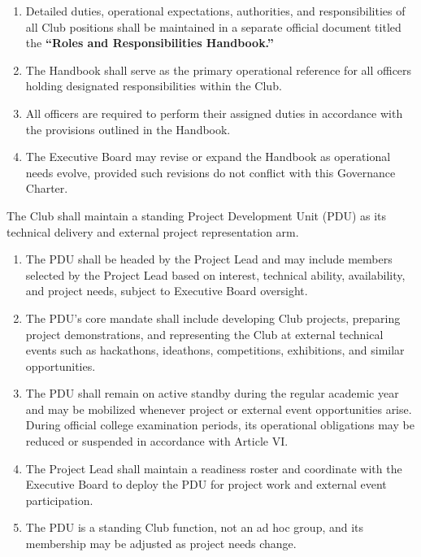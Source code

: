 \begin{enumerate}[label=\alph*), leftmargin=2em, itemsep=0.3em]
    \item Detailed duties, operational expectations, authorities, and responsibilities of all Club positions shall be maintained in a separate official document titled the \textbf{``Roles and Responsibilities Handbook.''}
    
    \item The Handbook shall serve as the primary operational reference for all officers holding designated responsibilities within the Club.
    
    \item All officers are required to perform their assigned duties in accordance with the provisions outlined in the Handbook.
    
    \item The Executive Board may revise or expand the Handbook as operational needs evolve, provided such revisions do not conflict with this Governance Charter.
\end{enumerate}


The Club shall maintain a standing Project Development Unit (PDU) as its technical delivery and external project representation arm.

\begin{enumerate}[label=\alph*), leftmargin=2em, itemsep=0.3em]
    \item The PDU shall be headed by the Project Lead and may include members selected by the Project Lead based on interest, technical ability, availability, and project needs, subject to Executive Board oversight.
    \item The PDU's core mandate shall include developing Club projects, preparing project demonstrations, and representing the Club at external technical events such as hackathons, ideathons, competitions, exhibitions, and similar opportunities.
    \item The PDU shall remain on active standby during the regular academic year and may be mobilized whenever project or external event opportunities arise. During official college examination periods, its operational obligations may be reduced or suspended in accordance with Article VI.
    \item The Project Lead shall maintain a readiness roster and coordinate with the Executive Board to deploy the PDU for project work and external event participation.
    \item The PDU is a standing Club function, not an ad hoc group, and its membership may be adjusted as project needs change.
\end{enumerate}